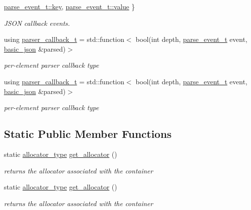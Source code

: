 \begin{DoxyCompactItemize}
\hyperlink{classnlohmann_1_1basic__json_aea1c863b719b4ca5b77188c171bbfafea3c6e0b8a9c15224a8228b9a98ca1531d}{parse\-\_\-event\-\_\-t\-::key}, 
\hyperlink{classnlohmann_1_1basic__json_aea1c863b719b4ca5b77188c171bbfafea2063c1608d6e0baf80249c42e2be5804}{parse\-\_\-event\-\_\-t\-::value}
 \}
\begin{DoxyCompactList}\small\item\em J\-S\-O\-N callback events. \end{DoxyCompactList}\item 
using \hyperlink{classnlohmann_1_1basic__json_a9e35475e2027520a78e09f460dbe048a}{parser\-\_\-callback\-\_\-t} = std\-::function$<$ bool(int depth, \hyperlink{classnlohmann_1_1basic__json_aea1c863b719b4ca5b77188c171bbfafe}{parse\-\_\-event\-\_\-t} event, \hyperlink{classnlohmann_1_1basic__json}{basic\-\_\-json} \&parsed)$>$
\begin{DoxyCompactList}\small\item\em per-\/element parser callback type \end{DoxyCompactList}\item 
using \hyperlink{classnlohmann_1_1basic__json_a9e35475e2027520a78e09f460dbe048a}{parser\-\_\-callback\-\_\-t} = std\-::function$<$ bool(int depth, \hyperlink{classnlohmann_1_1basic__json_aea1c863b719b4ca5b77188c171bbfafe}{parse\-\_\-event\-\_\-t} event, \hyperlink{classnlohmann_1_1basic__json}{basic\-\_\-json} \&parsed)$>$
\begin{DoxyCompactList}\small\item\em per-\/element parser callback type \end{DoxyCompactList}\end{DoxyCompactItemize}
\subsection*{Static Public Member Functions}
\begin{DoxyCompactItemize}
\item 
static \hyperlink{classnlohmann_1_1basic__json_aa44ce84b9ac506b905b8fb56c9a0989d}{allocator\-\_\-type} \hyperlink{classnlohmann_1_1basic__json_a1a446a48beed4ea564addfd12d235793}{get\-\_\-allocator} ()
\begin{DoxyCompactList}\small\item\em returns the allocator associated with the container \end{DoxyCompactList}\item 
static \hyperlink{classnlohmann_1_1basic__json_aa44ce84b9ac506b905b8fb56c9a0989d}{allocator\-\_\-type} \hyperlink{classnlohmann_1_1basic__json_a1a446a48beed4ea564addfd12d235793}{get\-\_\-allocator} ()
\begin{DoxyCompactList}\small\item\em returns the allocator associated with the container \end{DoxyCompactList}\end{DoxyCompactItemize}
